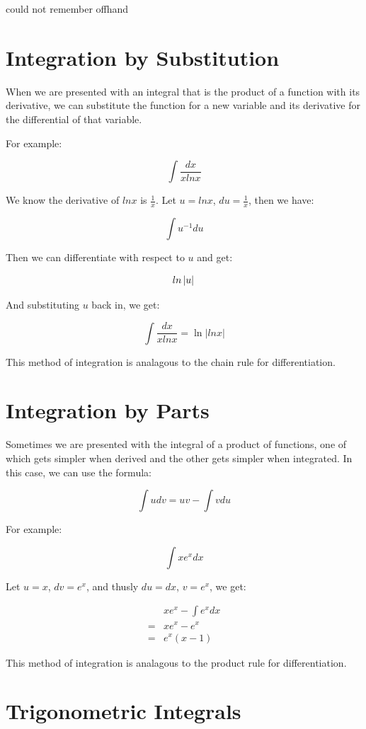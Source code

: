 \documentclass{article}
\begin{document}
{\tiny *could not remember offhand}

\section{Integration by Substitution}

When we are presented with an integral that is the product of a
function with its derivative, we can substitute the function for a new
variable and its derivative for the differential of that variable.

For example:

\[
\int \frac{dx}{xlnx}
\]

We know the derivative of $lnx$ is $\frac{1}{x}$.  Let $u=lnx$,
$du=\frac{1}{x}$, then we have:

\[
\int u^{-1}du
\]

Then we can differentiate with respect to $u$ and get:

\[
ln \left| u \right| \\
\]

And substituting $u$ back in, we get:

\[
\int \frac{dx}{xlnx} = \ln \left| lnx \right|
\]

This method of integration is analagous to the chain rule for
differentiation.

\section{Integration by Parts}

Sometimes we are presented with the integral of a product of
functions, one of which gets simpler when derived and the other gets
simpler when integrated.  In this case, we can use the formula:

\[
\int udv = uv - \int vdu
\]

For example:

\[
\int xe^xdx
\]

Let $u = x$, $dv = e^x$, and thusly $du = dx$, $v = e^x$, we get:

\begin{align*}
  &xe^x - \int e^xdx \\
  = &xe^x - e^x \\
  = &e^x(x-1)
\end{align*}

This method of integration is analagous to the product rule for
differentiation.

\section{Trigonometric Integrals}
\end{document}

